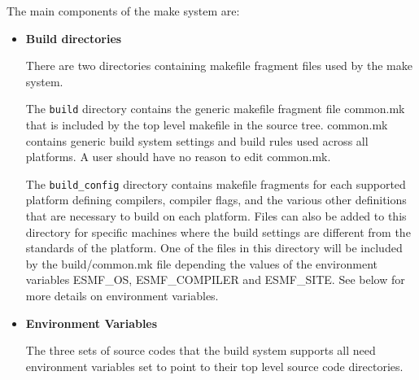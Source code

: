 The main components of the make system are:
\label{sec:BuildOptions}
\begin{itemize}
\item{{\bf Build directories}}

There are two directories containing makefile fragment files used by
the make system.  

The {\tt build} directory contains the generic makefile fragment file
common.mk that is included by the top level makefile in the source
tree.  common.mk contains generic build system settings and build
rules used across all platforms.  A user should have no reason to edit
common.mk.

The {\tt build\_config} directory contains makefile fragments for each
supported platform defining compilers, compiler flags, and the various
other definitions that are necessary to build on each platform.  Files
can also be added to this directory for specific machines where the
build settings are different from the standards of the platform.
One of the files in this directory will be included by the
build/common.mk file depending the values of the environment variables
ESMF\_OS, ESMF\_COMPILER and ESMF\_SITE.  See below for more details
on environment variables.

\item{{\bf Environment Variables}}

The three sets of source codes that the build system supports all need
environment variables set to point to their top level source code
directories.

\end{itemize}
